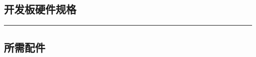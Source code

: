 
\subsection{开发板硬件规格}\label{ux5f00ux53d1ux677fux786cux4ef6ux89c4ux683c}

\begin{center}\rule{0.5\linewidth}{0.5pt}\end{center}

\subsection{所需配件}\label{ux6240ux9700ux914dux4ef6}

